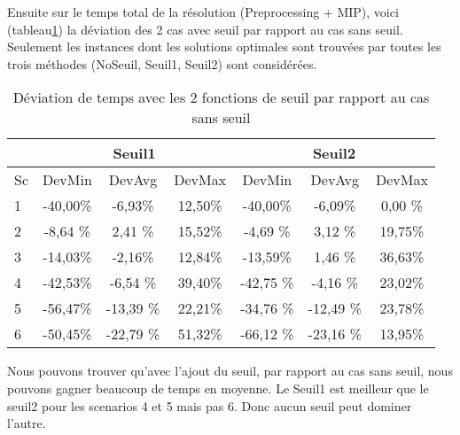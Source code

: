 \documentclass[twoside,fleqn]{EPURapport}
\begin{document}
Ensuite sur le temps total de la résolution (Preprocessing + MIP), voici (tableau\ref{tab_cut2_seuil_tim_cmp}) la déviation des 2 cas avec seuil par rapport au cas sans seuil. Seulement les instances dont les solutions optimales sont trouvées par toutes les trois méthodes (NoSeuil, Seuil1, Seuil2) sont considérées.
\begin{table}[h]
    \centering
    \begin{tabular}{|l|c|c|c|c|c|c|}
    	\hline
  &\multicolumn{3}{c}{Seuil1}	&\multicolumn{3}{|c|}{Seuil2}\\ \hline
 Sc  & 	DevMin	& DevAvg	& DevMax& 	DevMin	& DevAvg	&DevMax  \\ \hline
1&	-40,00\%&	-6,93\%&	12,50\%&	-40,00\%&	-6,09\%&	0,00 \%    \\ \hline
2&	-8,64 \%&	2,41 \%&	15,52\%&	-4,69 \%&	3,12 \%&	19,75\%     \\ \hline
3&	-14,03\%&	-2,16\%&	12,84\%&	-13,59\%&	1,46 \%&	36,63\%  \\ \hline
4 & -42,53\%	&	-6,54	\% &39,40\% &	-42,75	\% &-4,16	\% &23,02\%    \\ \hline
5 & -56,47\%	&	-13,39	\% &22,21\% &	-34,76	\% &-12,49	\% &23,78\%     \\ \hline
6  & -50,45\%	&	-22,79	\%& 51,32\%& 	-66,12	\%& -23,16	\%& 13,95\%  \\ \hline
    \end{tabular}
    \caption{Déviation de temps avec les 2 fonctions de seuil par rapport au cas sans seuil}
    \label{tab_cut2_seuil_tim_cmp}
    
\end{table}
\bigskip

Nous pouvons trouver qu'avec l'ajout du seuil, par rapport au cas sans seuil, nous pouvons gagner beaucoup de temps en moyenne. Le Seuil1 est meilleur que le seuil2 pour les scenarios 4 et 5 mais pas 6. Donc aucun seuil peut dominer l'autre.
\end{document}
